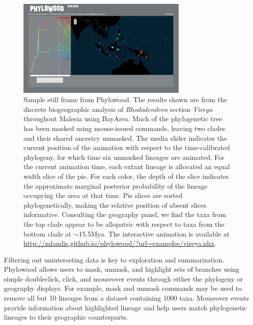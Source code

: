 \documentclass{bioinfo}
\begin{document}
\begin{figure}
\begin{center}
\includegraphics[width=3.3in]{phylowood.png}
\caption{Sample still frame from Phylowood. The results shown are from the discrete biogeographic analysis of {\it Rhododendron} section {\it Vireya} throughout Malesia using BayArea. Much of the phylogenetic tree has been masked using mouse-issued commands, leaving two clades and their shared ancestry unmasked. The media slider indicates the current position of the animation with respect to the time-calibrated phylogeny, for which time six unmasked lineages are animated.  For the current animation time, each extant lineage is allocated an equal width slice of the pie. For each color, the depth of the slice indicates the approximate marginal posterior probability of the lineage occupying the area at that time. Pie slices are sorted phylogenetically, making the relative position of absent slices informative. Consulting the geography panel, we find the taxa from the top clade appear to be allopatric with respect to taxa from the bottom clade at $\sim$15.5Mya. The interactive animation is available at \href{http://mlandis.github.io/phylowood/?url=examples/vireya.nhx}{http://mlandis.github.io/phylowood/?url=examples/vireya.nhx}.}
\label{phylowood}
\end{center}
\end{figure}

Filtering out uninteresting data is key to exploration and summarization. Phylowood allows users to mask, unmask, and highlight sets of branches using simple doubleclick, click, and mouseover events through either the phylogeny or geography displays. For example, mask and unmask commands may be used to remove all but 10 lineages from a dataset containing 1000 taxa. Mouseover events provide information about highlighted lineage and help users match phylogenetic lineages to their geographic counterparts.
\end{document}
